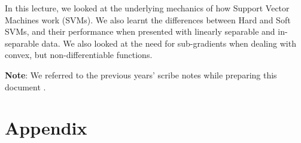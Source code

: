 \documentclass[11pt]{article}
\begin{document}
In this lecture, we looked at the underlying mechanics of how Support Vector Machines work (SVMs). We also learnt the differences between Hard and Soft SVMs, and their performance when presented with linearly separable and in-separable data. We also looked at the need for sub-gradients when dealing with convex, but non-differentiable functions.

\textbf{Note}: We referred to the previous years' scribe notes while preparing this document \cite{Paritosh2021}.

\section{Appendix}


{


}


\end{document}
